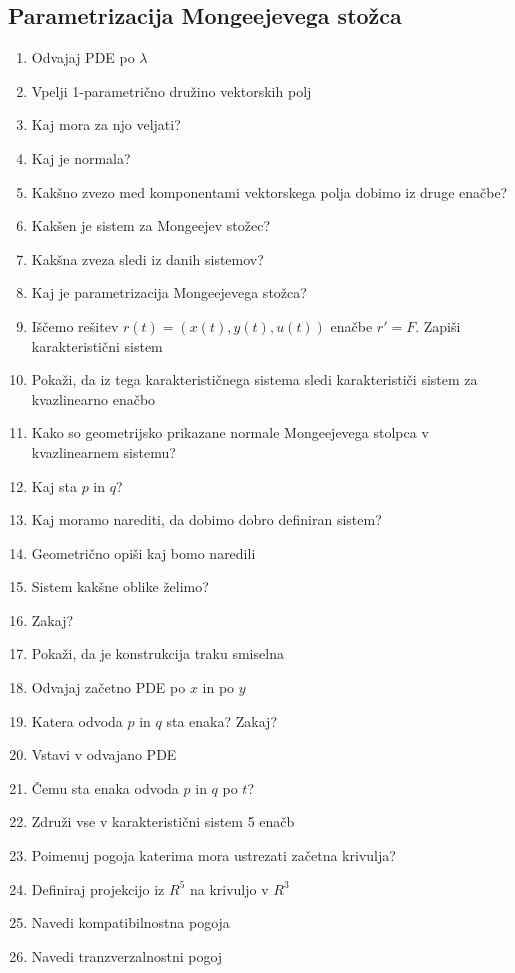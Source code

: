 \documentclass{article}
\begin{document}
    \subsection{Parametrizacija Mongeejevega stožca}
    \begin{enumerate}
        \item Odvajaj PDE po $\lambda$
        \item Vpelji 1-parametrično družino vektorskih polj
        \item Kaj mora za njo veljati?
        \item Kaj je normala?
        \item Kakšno zvezo med komponentami vektorskega polja dobimo iz druge enačbe?
        \item Kakšen je sistem za Mongeejev stožec?
        \item Kakšna zveza sledi iz danih sistemov?
        \item Kaj je parametrizacija Mongeejevega stožca?
        \item Iščemo rešitev $r(t) = (x(t), y(t), u(t))$ enačbe $r' = F$. Zapiši karakteristični sistem 
        \item Pokaži, da iz tega karakterističnega sistema sledi karakterističi sistem za kvazlinearno enačbo
        \item Kako so geometrijsko prikazane normale Mongeejevega stolpca v kvazlinearnem sistemu?
        \item Kaj sta $p$ in $q$?
        \item Kaj moramo narediti, da dobimo dobro definiran sistem?
        \item Geometrično opiši kaj bomo naredili
        \item Sistem kakšne oblike želimo?
        \item Zakaj?
        \item Pokaži, da je konstrukcija traku smiselna
        \item Odvajaj začetno PDE po $x$ in po $y$
        \item Katera odvoda $p$ in $q$ sta enaka? Zakaj? 
        \item Vstavi v odvajano PDE
        \item Čemu sta enaka odvoda $p$ in $q$ po $t$?
        \item Združi vse v karakteristični sistem 5 enačb
        \item Poimenuj pogoja katerima mora ustrezati začetna krivulja?
        \item Definiraj projekcijo iz $R^5$ na krivuljo v $R^3$
        \item Navedi kompatibilnostna pogoja
        \item Navedi tranzverzalnostni pogoj
    \end{enumerate}
\end{document}
